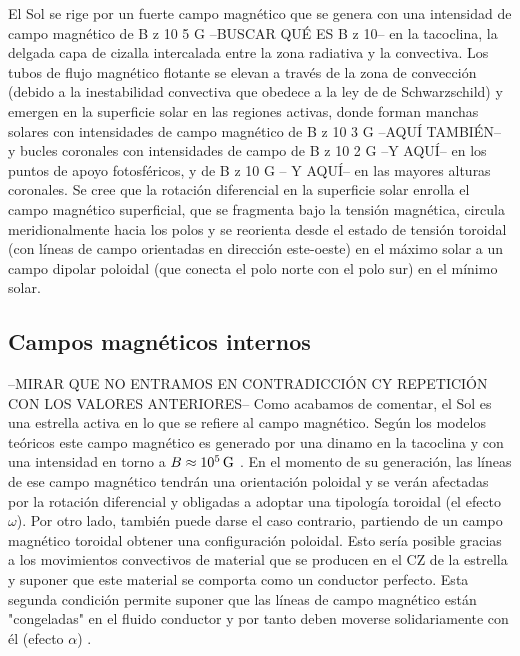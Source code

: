 El Sol se rige por un fuerte campo magnético que se genera con una intensidad de campo magnético de B z 10 5 G --BUSCAR QUÉ ES B z 10-- \citep{Aschwanden2014} en la tacoclina, la delgada capa de cizalla intercalada entre la zona radiativa y la convectiva. Los tubos de flujo magnético flotante se elevan a través de la zona de convección (debido a la inestabilidad convectiva que obedece a la ley de de Schwarzschild) y emergen en la superficie solar en las regiones activas, donde forman manchas solares con intensidades de campo magnético de B z 10 3 G --AQUÍ TAMBIÉN-- y bucles coronales con intensidades de campo de B z 10 2 G --Y AQUÍ-- en los puntos de apoyo fotosféricos, y de B z 10 G -- Y AQUÍ-- en las mayores alturas coronales. Se cree que la rotación diferencial en la superficie solar enrolla el campo magnético superficial, que se fragmenta bajo la tensión magnética, circula meridionalmente hacia los polos y se reorienta desde el estado de tensión toroidal (con líneas de campo orientadas en dirección este-oeste) en el máximo solar a un campo dipolar poloidal (que conecta el polo norte con el polo sur) en el mínimo solar.\par

\subsection{Campos magnéticos internos}
--MIRAR QUE NO ENTRAMOS EN CONTRADICCIÓN CY REPETICIÓN CON LOS VALORES ANTERIORES--
Como acabamos de comentar, el Sol es una estrella activa en lo que se refiere al campo magnético. Según los modelos teóricos este campo magnético es generado por una dinamo en la tacoclina y con una intensidad en torno a $B\approx10^{5}\,\mathrm{G}$ \citep{Maeder2003a,Dudorov2014}. En el momento de su generación, las líneas de ese campo magnético tendrán una orientación poloidal y se verán afectadas por la rotación diferencial y obligadas a adoptar una tipología toroidal (el efecto $\omega$). Por otro lado, también puede darse el caso contrario, partiendo de un campo magnético toroidal obtener una configuración poloidal. Esto sería posible gracias a los movimientos convectivos de material que se producen en el CZ de la estrella y suponer que este material se comporta como un conductor perfecto. Esta segunda condición permite suponer que las líneas de campo magnético están "congeladas" en el fluido conductor y por tanto deben moverse solidariamente con él (efecto $\alpha$) \citep{Stanley2014}.\par

